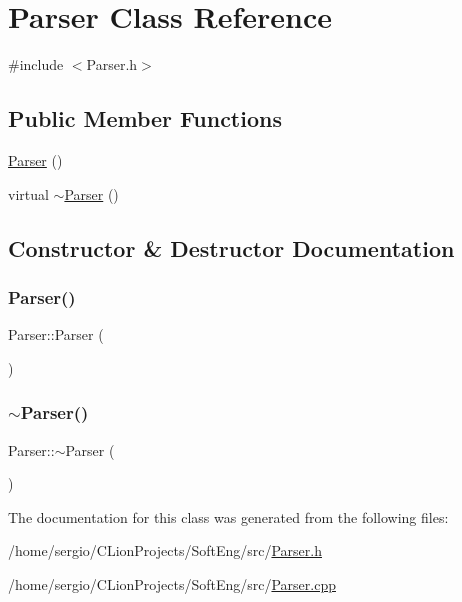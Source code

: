 \hypertarget{class_parser}{}\section{Parser Class Reference}
\label{class_parser}


{\ttfamily \#include $<$Parser.\+h$>$}

\subsection*{Public Member Functions}
\begin{DoxyCompactItemize}
\item 
\hyperlink{class_parser_a12234f6cd36b61af4b50c94a179422c1}{Parser} ()
\item 
virtual \hyperlink{class_parser_a3e658b5917a93a3ef648050d060e3a93}{$\sim$\+Parser} ()
\end{DoxyCompactItemize}


\subsection{Constructor \& Destructor Documentation}
\mbox{\label{class_parser_a12234f6cd36b61af4b50c94a179422c1}} 
\subsubsection{\texorpdfstring{Parser()}{Parser()}}
{\footnotesize\ttfamily Parser\+::\+Parser (\begin{DoxyParamCaption}{ }\end{DoxyParamCaption})}

\mbox{\label{class_parser_a3e658b5917a93a3ef648050d060e3a93}} 
\subsubsection{\texorpdfstring{$\sim$\+Parser()}{~Parser()}}
{\footnotesize\ttfamily Parser\+::$\sim$\+Parser (\begin{DoxyParamCaption}{ }\end{DoxyParamCaption})\hspace{0.3cm}{\ttfamily [virtual]}}



The documentation for this class was generated from the following files\+:\begin{DoxyCompactItemize}
\item 
/home/sergio/\+C\+Lion\+Projects/\+Soft\+Eng/src/\hyperlink{_parser_8h}{Parser.\+h}\item 
/home/sergio/\+C\+Lion\+Projects/\+Soft\+Eng/src/\hyperlink{_parser_8cpp}{Parser.\+cpp}\end{DoxyCompactItemize}
